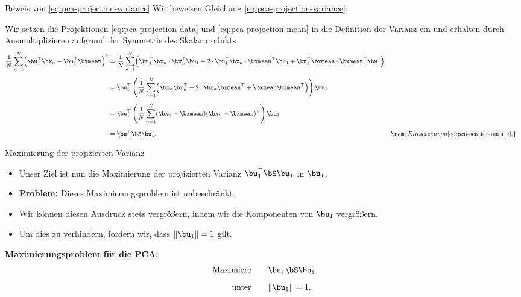 \begin{frame}{Beweis von \eqref{eq:pca-projection-variance}}{}
	Wir beweisen Gleichung \eqref{eq:pca-projection-variance}: \\ \vspace*{2mm}
	\begin{myproof}
		Wir setzen die Projektionen \eqref{eq:pca-projection-data} und \eqref{eq:pca-projection-mean} in die Definition
		der Varianz ein und erhalten durch Ausmultiplizieren aufgrund der Symmetrie des Skalarprodukts
		\begin{align*}
			\frac{1}{N} \sum_{n=1}^N \Bigl( \bu_1^\top \bx_n - \bu_1^\top \bxmean \Bigr)^2
				&= \frac{1}{N} \sum_{n=1}^N \Bigl(
					\bu_1^\top \bx_n \cdot \bx_n^\top \bu_1 - 2 \cdot \bu_1^\top \bx_n \cdot \bxmean^\top \bu_1
						+ \bu_1^\top \bxmean \cdot \bxmean^\top \bu_1
				\Bigr)
		\\[2mm]
				&= \bu_1^\top \left(
					\frac{1}{N} \sum_{n=1}^N \Bigl( \bx_n \bx_n^\top - 2 \cdot \bx_n \bxmean^\top + \bxmean\bxmean^\top \Bigr)
				\right) \bu_1
		\\[2mm]
				&= \bu_1^\top \left( \frac{1}{N} \sum_{n=1}^N (\bx_n - \bxmean) (\bx_n - \bxmean)^\top \right) \bu_1
		\\[2mm]
				&= \bu_1^\top \bS \bu_1.
				&& \rem{Einsetzen von \eqref{eq:pca-scatter-matrix}.}
		\end{align*}
	\end{myproof}
\end{frame}


\begin{frame}{Maximierung der projizierten Varianz}{}
	\begin{itemize}
		\item Unser Ziel ist nun die Maximierung der projizierten Varianz $\bu_1^\top \bS \bu_1$ in $\bu_1$.
		\item \textbf{Problem:} Dieses Maximierungsproblem ist unbeschränkt.
		\item Wir können diesen Ausdruck stets vergrößern, indem wir die Komponenten von $\bu_1$ vergrößern.
		\item Um dies zu verhindern, fordern wir, dass $\Vert \bu_1 \Vert = 1$ gilt.
	\end{itemize}

	\begin{boxGray}
		\textbf{Maximierungsproblem für die PCA:}
		\begin{equation} \label{eq:pca-max-var-problem}
			\begin{aligned}
				\text{Maximiere} 	&\qquad \bu_1 \bS \bu_1
			\\[2mm]
				\text{unter} 		&\qquad \Vert \bu_1 \Vert = 1.
			\end{aligned}
		\end{equation}
	\end{boxGray}
\end{frame}


